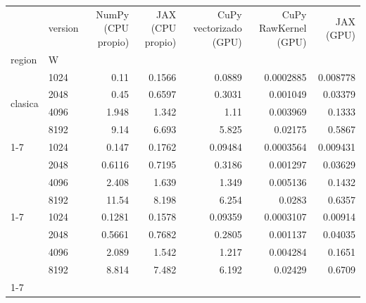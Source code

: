 \begin{tabular}{llrrrrr}
\toprule
 & version & NumPy (CPU propio) & JAX (CPU propio) & CuPy vectorizado (GPU) & CuPy RawKernel (GPU) & JAX (GPU) \\
region & W &  &  &  &  &  \\
\midrule
\multirow[t]{4}{*}{clasica} & 1024 & 0.11 & 0.1566 & 0.0889 & 0.0002885 & 0.008778 \\
 & 2048 & 0.45 & 0.6597 & 0.3031 & 0.001049 & 0.03379 \\
 & 4096 & 1.948 & 1.342 & 1.11 & 0.003969 & 0.1333 \\
 & 8192 & 9.14 & 6.693 & 5.825 & 0.02175 & 0.5867 \\
\cline{1-7}
\multirow[t]{4}{*}{frontera_central} & 1024 & 0.147 & 0.1762 & 0.09484 & 0.0003564 & 0.009431 \\
 & 2048 & 0.6116 & 0.7195 & 0.3186 & 0.001297 & 0.03629 \\
 & 4096 & 2.408 & 1.639 & 1.349 & 0.005136 & 0.1432 \\
 & 8192 & 11.54 & 8.198 & 6.254 & 0.0283 & 0.6357 \\
\cline{1-7}
\multirow[t]{4}{*}{frontera_lateral} & 1024 & 0.1281 & 0.1578 & 0.09359 & 0.0003107 & 0.00914 \\
 & 2048 & 0.5661 & 0.7682 & 0.2805 & 0.001137 & 0.04035 \\
 & 4096 & 2.089 & 1.542 & 1.217 & 0.004284 & 0.1651 \\
 & 8192 & 8.814 & 7.482 & 6.192 & 0.02429 & 0.6709 \\
\cline{1-7}
\bottomrule
\end{tabular}

